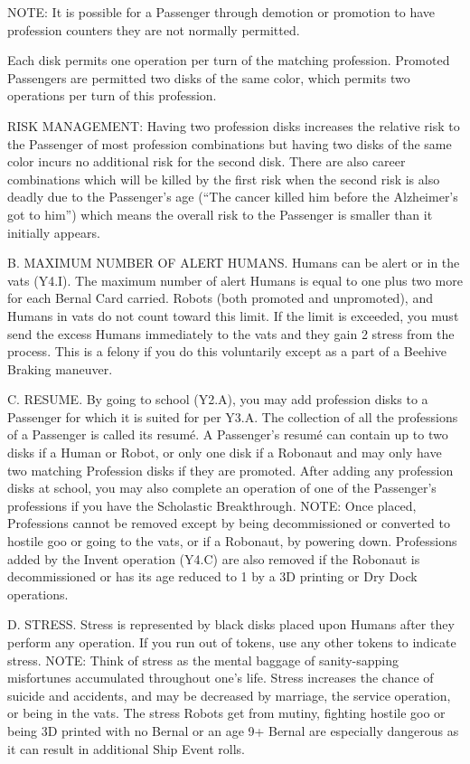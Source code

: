 \documentclass[a4paper]{book}
\begin{document}
NOTE: It is possible for a Passenger through demotion or promotion to have profession counters they are not normally permitted.

Each disk permits one operation per turn of the matching profession. Promoted Passengers are permitted two disks of the same color, which permits two operations per turn of this profession.

RISK MANAGEMENT: Having two profession disks increases the relative risk to the Passenger of most profession combinations but having two disks of the same color incurs no additional risk for the second disk. There are also career combinations which will be killed by the first risk when the second risk is also deadly due to the Passenger’s age (“The cancer killed him before the Alzheimer’s got to him”) which means the overall risk to the Passenger is smaller than it initially appears.
 
B. MAXIMUM NUMBER OF ALERT HUMANS. Humans can be alert or in the vats (Y4.I). The maximum number of alert Humans is equal to one plus two more for each Bernal Card carried. Robots (both promoted and unpromoted), and Humans in vats do not count toward this limit. If the limit is exceeded, you must send the excess Humans immediately to the vats and they gain 2 stress from the process. This is a felony if you do this voluntarily except as a part of a Beehive Braking maneuver.
 
C. RESUME. By going to school (Y2.A), you may add profession disks to a Passenger for which it is suited for per Y3.A. The collection of all the professions of a Passenger is called its resumé. A Passenger’s resumé can contain up to two disks if a Human or Robot, or only one disk if a Robonaut and may only have two matching Profession disks if they are promoted. After adding any profession disks at school, you may also complete an operation of one of the Passenger’s professions if you have the Scholastic Breakthrough. 
NOTE: Once placed, Professions cannot be removed except by being decommissioned or converted to hostile goo or going to the vats, or if a Robonaut, by powering down. Professions added by the Invent operation (Y4.C) are also removed if the Robonaut is decommissioned or has its age reduced to 1 by a 3D printing or Dry Dock operations.
 
D. STRESS. Stress is represented by black disks placed upon Humans after they perform any operation. If you run out of tokens, use any other tokens to indicate stress.
NOTE: Think of stress as the mental baggage of sanity-sapping misfortunes accumulated throughout one’s life. Stress increases the chance of suicide and accidents, and may be decreased by marriage, the service operation, or being in the vats. The stress Robots get from mutiny, fighting hostile goo or being 3D printed with no Bernal or an age 9+ Bernal are especially dangerous as it can result in additional Ship Event rolls.
 
\end{document}
